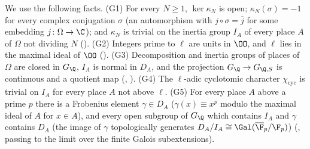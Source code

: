 We use the following facts. (G1) For every $N\ge1$, $\ker\kappa_N$ is open; $\kappa_N(\sigma)=-1$ for every complex conjugation $\sigma$ (an
automorphism with $j\circ\sigma=\overline{j}$ for some embedding $j\colon\Omega\to\C$); and $\kappa_N$ is trivial on the inertia group $I_A$ of every
place $A$ of $\Omega$ not dividing $N$ (). (G2) Integers prime to $\ell$ are units in $\OO$, and
$\ell$ lies in the maximal ideal of $\OO$ (). (G3) Decomposition and inertia groups of places of
$\Omega$ are closed in $G_\Q$, $I_A$ is normal in $D_A$, and the projection $G_\Q\to G_{\Q,S}$ is continuous and a quotient map
(, ). (G4) The $\ell$-adic cyclotomic
character $\chi_{\mathrm{cyc}}$ is trivial on $I_A$ for every place $A$ not above $\ell$. (G5) For every place $A$ above a prime $p$ there is a
Frobenius element $\gamma\in D_A$ ($\gamma(x)\equiv x^p$ modulo the maximal ideal of $A$ for $x\in A$), and every open subgroup of $G_\Q$ which
contains $I_A$ and $\gamma$ contains $D_A$ (the image of $\gamma$ topologically generates $D_A/I_A\cong\Gal(\overline{\F}_p/\F_p)$)
(\cite[Ch.~I, \S9]{Neukirch1999}, passing to the limit over the finite Galois subextensions).

